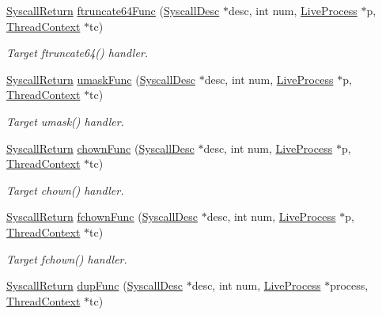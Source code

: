 \begin{DoxyCompactItemize}
\hyperlink{classSyscallReturn}{SyscallReturn} \hyperlink{syscall__emul_8hh_ab6f7a64ebc9b0e6b072fe33b42b5015b}{ftruncate64Func} (\hyperlink{classSyscallDesc}{SyscallDesc} $\ast$desc, int num, \hyperlink{classLiveProcess}{LiveProcess} $\ast$p, \hyperlink{classThreadContext}{ThreadContext} $\ast$tc)
\begin{DoxyCompactList}\small\item\em Target ftruncate64() handler. \item\end{DoxyCompactList}\item 
\hyperlink{classSyscallReturn}{SyscallReturn} \hyperlink{syscall__emul_8hh_a90bdffbc29a5b2b7953ae380819fc903}{umaskFunc} (\hyperlink{classSyscallDesc}{SyscallDesc} $\ast$desc, int num, \hyperlink{classLiveProcess}{LiveProcess} $\ast$p, \hyperlink{classThreadContext}{ThreadContext} $\ast$tc)
\begin{DoxyCompactList}\small\item\em Target umask() handler. \item\end{DoxyCompactList}\item 
\hyperlink{classSyscallReturn}{SyscallReturn} \hyperlink{syscall__emul_8hh_a30e4f3dddc7a190609b40155566eb23f}{chownFunc} (\hyperlink{classSyscallDesc}{SyscallDesc} $\ast$desc, int num, \hyperlink{classLiveProcess}{LiveProcess} $\ast$p, \hyperlink{classThreadContext}{ThreadContext} $\ast$tc)
\begin{DoxyCompactList}\small\item\em Target chown() handler. \item\end{DoxyCompactList}\item 
\hyperlink{classSyscallReturn}{SyscallReturn} \hyperlink{syscall__emul_8hh_ac6c9a2c70e0ab95d055e01fb41987854}{fchownFunc} (\hyperlink{classSyscallDesc}{SyscallDesc} $\ast$desc, int num, \hyperlink{classLiveProcess}{LiveProcess} $\ast$p, \hyperlink{classThreadContext}{ThreadContext} $\ast$tc)
\begin{DoxyCompactList}\small\item\em Target fchown() handler. \item\end{DoxyCompactList}\item 
\hyperlink{classSyscallReturn}{SyscallReturn} \hyperlink{syscall__emul_8hh_a56b6a187c0e6aa20f278735a8d555dbd}{dupFunc} (\hyperlink{classSyscallDesc}{SyscallDesc} $\ast$desc, int num, \hyperlink{classLiveProcess}{LiveProcess} $\ast$process, \hyperlink{classThreadContext}{ThreadContext} $\ast$tc)

\end{DoxyCompactItemize}
